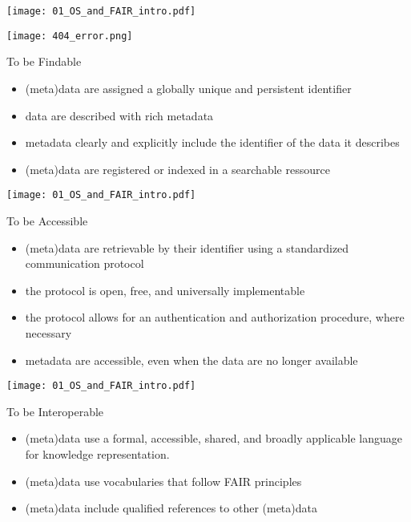 \begin{frame}
\centering\texttt{[image: 01\_OS\_and\_FAIR\_intro.pdf]}
\end{frame}


\begin{frame}
\centering\texttt{[image: 404\_error.png]}
\end{frame}


\begin{frame}
\begin{block}{To be Findable}
\begin{itemize}
\item (meta)data are assigned a globally unique and persistent identifier
\item data are described with rich metadata
\item metadata clearly and explicitly include the identifier of the data it describes
\item (meta)data are registered or indexed in a searchable ressource
\end{itemize}
\end{block}
\end{frame}

\begin{frame}
\texttt{[image: 01\_OS\_and\_FAIR\_intro.pdf]}
\end{frame}

\begin{frame}
\begin{block}{To be Accessible}
\begin{itemize}
\item (meta)data are retrievable by their identifier using a standardized communication protocol
\item the protocol is open, free, and universally implementable
\item the protocol allows for an authentication and authorization procedure, where necessary
\item metadata are accessible, even when the data are no longer available
\end{itemize}
\end{block}
\end{frame}

\begin{frame}
\texttt{[image: 01\_OS\_and\_FAIR\_intro.pdf]}
\end{frame}

\begin{frame}
\begin{block}{To be Interoperable}
\begin{itemize}
\item (meta)data use a formal, accessible, shared, and broadly applicable language for knowledge representation.
\item (meta)data use vocabularies that follow FAIR principles
\item (meta)data include qualified references to other (meta)data
\end{itemize}
\end{block}
\end{frame}

